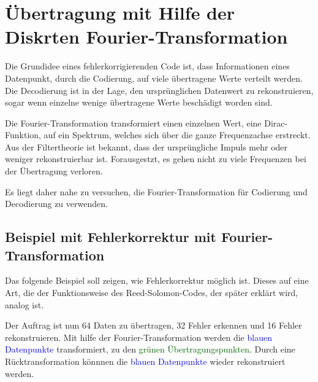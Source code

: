 %
%
\section{Übertragung mit Hilfe der Diskrten Fourier-Transformation
\label{reedsolomon:section:dtf}}
Die Grundidee eines fehlerkorrigierenden Code ist, dass Informationen eines Datenpunkt, 
durch die Codierung, auf viele übertragene Werte verteilt werden.
Die Decodierung ist in der Lage, den ursprünglichen Datenwert zu rekonstruieren,
sogar wenn einzelne wenige übertragene Werte beschädigt worden sind.
\par
Die Fourier-Transformation transformiert einen einzelnen Wert, 
eine Dirac-Funktion, auf ein Spektrum, welches sich über die ganze Frequenzachse erstreckt.
Aus der Filtertheorie ist bekannt, dass der ursprüngliche Impuls mehr oder weniger rekonstruierbar ist.
Forausgestzt, es gehen nicht zu viele Frequenzen bei der Übertragung verloren.
\par
Es liegt daher nahe zu versuchen, die Fourier-Transformation 
für Codierung und Decodierung zu verwenden.

\subsection{Beispiel mit Fehlerkorrektur mit Fourier-Transformation
\label{reedsolomon:subsection:sendbsp}}

Das folgende Beispiel soll zeigen, wie Fehlerkorrektur möglich ist.
Dieses auf eine Art, die der Funktionsweise des Reed-Solomon-Codes,
der später erklärt wird, analog ist.
\par
Der Auftrag ist nun 64 Daten zu übertragen, 32 Fehler erkennen und 16 Fehler rekonstruieren.
Mit hilfe der Fourier-Transformation werden die \textcolor{blue}{blauen Datenpunkte} transformiert,
zu den \textcolor{darkgreen}{grünen Übertragungspunkten}. 
Durch eine Rücktransformation könnnen die \textcolor{blue}{blauen Datenpunkte} wieder rekonstruiert werden.

